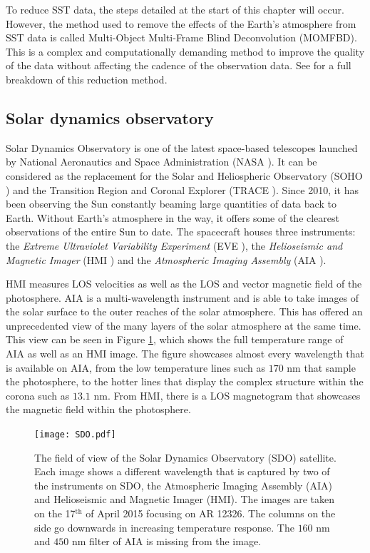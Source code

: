     To reduce SST data, the steps detailed at the start of this chapter will occur.
    However, the method used to remove the effects of the Earth's atmosphere from SST data is called Multi-Object Multi-Frame Blind Deconvolution (MOMFBD).
    This is a complex and computationally demanding method to improve the quality of the data without affecting the cadence of the observation data. 
    See \cite{Noort2005} for a full breakdown of this reduction method. 
    
\subsection{Solar dynamics observatory}

	Solar Dynamics Observatory is one of the latest space-based telescopes launched by National Aeronautics and Space Administration (NASA \citealt{2012SoPh..275....3P}).
	It can be considered as the replacement for the Solar and Heliospheric Observatory (SOHO \citealt{domingo1995soho}) and the Transition Region and Coronal Explorer (TRACE \citealt{TRACE}).
    Since 2010, it has been observing the Sun constantly beaming large quantities of data back to Earth.
	Without Earth's atmosphere in the way, it offers some of the clearest observations of the entire Sun to date. 
	The spacecraft houses three instruments: the \textit{Extreme Ultraviolet Variability Experiment} (EVE \citealt{2012SoPh..275..115W}), the \textit{Helioseismic and Magnetic Imager} (HMI \citealt{2012SoPh..275..229S}) and the \textit{Atmospheric Imaging Assembly} (AIA \citealt{2012SoPh..275...17L}).
	 
	HMI measures LOS velocities as well as the LOS and vector magnetic field of the photosphere.
	AIA is a multi-wavelength instrument and is able to take images of the solar surface to the outer reaches of the solar atmosphere.
    This has offered an unprecedented view of the many layers of the solar atmosphere at the same time.
    This view can be seen in Figure \ref{fig:SDO}, which shows the full temperature range of AIA as well as an HMI image.
    The figure showcases almost every wavelength that is available on AIA, from the low temperature lines such as $170$ nm that sample the photosphere, to the hotter lines that display the complex structure within the corona such as $13.1$ nm. 
    From HMI, there is a LOS magnetogram that showcases the magnetic field within the photosphere.
    
   	\begin{figure}
        \centering
        \texttt{[image: SDO.pdf]}
        \caption{
                The field of view of the Solar Dynamics Observatory (SDO) satellite.
                Each image shows a different wavelength that is captured by two of the instruments on SDO, the Atmospheric Imaging Assembly (AIA) and Helioseismic and Magnetic Imager (HMI).
                The images are taken on the 17$^\mathrm{th}$ of April 2015 focusing on AR 12326.
                The columns on the side go downwards in increasing temperature response.
                The $160$ nm and $450$ nm filter of AIA is missing from the image.
                }
        \label{fig:SDO}
    \end{figure}
    
